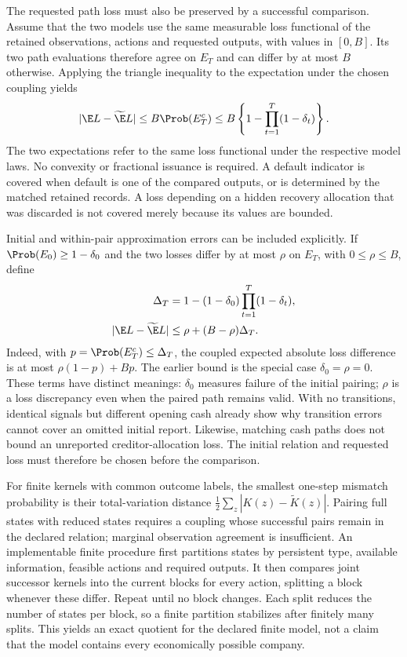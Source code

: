 The requested path loss must also be preserved by a successful comparison.
Assume that the two models use the same measurable loss functional of the
retained observations, actions and requested outputs, with values in $[0,B]$.
Its two path evaluations therefore agree on $E_T$ and can differ by at most
$B$ otherwise. Applying the triangle inequality to the expectation under the
chosen coupling yields
\begin{equation}
|\E L-\widetilde\E L|
\le B\Prob(E_T^c)
\le B\left\{1-\prod_{t=1}^T(1-\delta_t)\right\}.
\label{sim:lit-finite-cost}
\end{equation}
The two expectations refer to the same loss functional under the respective
model laws. No convexity or fractional issuance is required. A default
indicator is covered when default is one of the compared outputs, or is
determined by the matched retained records. A loss depending on a hidden
recovery allocation that was discarded is not covered merely because its
values are bounded.

Initial and within-pair approximation errors can be included explicitly. If
$\Prob(E_0)\geq1-\delta_0$ and the two losses differ by at most $\rho$ on
$E_T$, with $0\leq\rho\leq B$, define
\begin{align}
\Delta_T&=1-(1-\delta_0)\prod_{t=1}^T(1-\delta_t),
\label{sim:lit-initial-coupling}\\
|\E L-\widetilde\E L|&\leq
\rho+(B-\rho)\Delta_T.
\label{sim:lit-matched-loss}
\end{align}
Indeed, with $p=\Prob(E_T^c)\leq\Delta_T$, the coupled expected absolute
loss difference is at most $\rho(1-p)+Bp$. The earlier bound is the special
case $\delta_0=\rho=0$. These terms have distinct meanings: $\delta_0$
measures failure of the initial pairing; $\rho$ is a loss discrepancy even
when the paired path remains valid. With no transitions, identical signals
but different opening cash already show why transition errors cannot cover
an omitted initial report. Likewise, matching cash paths does not bound an
unreported creditor-allocation loss. The initial relation and requested loss
must therefore be chosen before the comparison.

For finite kernels with common outcome labels, the smallest one-step mismatch
probability is their total-variation distance
$\frac12\sum_z|K(z)-\widetilde K(z)|$. Pairing full states with reduced states
requires a coupling whose successful pairs remain in the declared relation;
marginal observation agreement is insufficient. An implementable finite
procedure first partitions states by persistent type, available information,
feasible actions and required outputs. It then compares joint successor
kernels into the current blocks for every action, splitting a block whenever
these differ. Repeat until no block changes. Each split reduces the number of
states per block, so a finite partition stabilizes after finitely many splits.
This yields an exact quotient for the declared finite model, not a claim that
the model contains every economically possible company.

